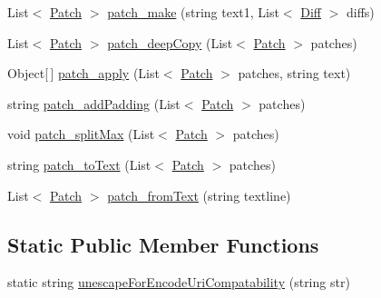 \begin{DoxyCompactItemize}
\item 
List$<$ \hyperlink{class_diff_match_patch_1_1_patch}{Patch} $>$ \hyperlink{class_diff_match_patch_1_1diff__match__patch_a3618b826aba2377f7bad9685047b9d01}{patch\+\_\+make} (string text1, List$<$ \hyperlink{class_diff_match_patch_1_1_diff}{Diff} $>$ diffs)
\item 
List$<$ \hyperlink{class_diff_match_patch_1_1_patch}{Patch} $>$ \hyperlink{class_diff_match_patch_1_1diff__match__patch_ab4cb9a7a80a39bde48581795ed8e3587}{patch\+\_\+deep\+Copy} (List$<$ \hyperlink{class_diff_match_patch_1_1_patch}{Patch} $>$ patches)
\item 
Object\mbox{[}$\,$\mbox{]} \hyperlink{class_diff_match_patch_1_1diff__match__patch_a414c4b1530b752b720b2fe4f09ad2a36}{patch\+\_\+apply} (List$<$ \hyperlink{class_diff_match_patch_1_1_patch}{Patch} $>$ patches, string text)
\item 
string \hyperlink{class_diff_match_patch_1_1diff__match__patch_a5b926839bcf772516abbf611ac1dad7f}{patch\+\_\+add\+Padding} (List$<$ \hyperlink{class_diff_match_patch_1_1_patch}{Patch} $>$ patches)
\item 
void \hyperlink{class_diff_match_patch_1_1diff__match__patch_a55f8ccb535ab8f9ec0cca560554dce82}{patch\+\_\+split\+Max} (List$<$ \hyperlink{class_diff_match_patch_1_1_patch}{Patch} $>$ patches)
\item 
string \hyperlink{class_diff_match_patch_1_1diff__match__patch_aab8f6a5791ce7bc4618586deecb9c000}{patch\+\_\+to\+Text} (List$<$ \hyperlink{class_diff_match_patch_1_1_patch}{Patch} $>$ patches)
\item 
List$<$ \hyperlink{class_diff_match_patch_1_1_patch}{Patch} $>$ \hyperlink{class_diff_match_patch_1_1diff__match__patch_a11cc2a5568c85387bc7ff13ad0630217}{patch\+\_\+from\+Text} (string textline)
\end{DoxyCompactItemize}
\subsection*{Static Public Member Functions}
\begin{DoxyCompactItemize}
\item 
static string \hyperlink{class_diff_match_patch_1_1diff__match__patch_a06fcc279bf0708827299fb26a7e3113b}{unescape\+For\+Encode\+Uri\+Compatability} (string str)
\end{DoxyCompactItemize}
